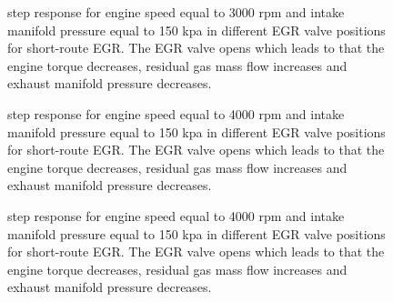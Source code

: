 \begin{figure}[tbp]
  \centering
  \qquad
  \caption{\label{fig:step_response_short_3000_150_2}%
    step response for engine speed equal to 3000 rpm and intake manifold pressure equal to 150 kpa in different EGR valve positions for short-route EGR. The EGR valve opens which leads to that the engine torque decreases, residual gas mass flow increases and exhaust manifold pressure decreases.}
\end{figure}

\begin{figure}[tbp]
  \centering
  \qquad
  \caption{\label{fig:step_response_short_4000_150_1}%
    step response for engine speed equal to 4000 rpm and intake manifold pressure equal to 150 kpa in different EGR valve positions for short-route EGR. The EGR valve opens which leads to that the engine torque decreases, residual gas mass flow increases and exhaust manifold pressure decreases.}
\end{figure}

\begin{figure}[tbp]
  \centering
  \qquad
  \caption{\label{fig:step_response_short_4000_150_2}%
    step response for engine speed equal to 4000 rpm and intake manifold pressure equal to 150 kpa in different EGR valve positions for short-route EGR. The EGR valve opens which leads to that the engine torque decreases, residual gas mass flow increases and exhaust manifold pressure decreases.}
\end{figure}

